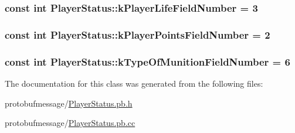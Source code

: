 \hypertarget{class_player_status_a335a1328cd6c4be06ecb9c13e6ea9abf}{
\subsubsection[{k\-Player\-Life\-Field\-Number}]{\setlength{\rightskip}{0pt plus 5cm}const int Player\-Status\-::k\-Player\-Life\-Field\-Number = 3\hspace{0.3cm}{\ttfamily [static]}}}\label{class_player_status_a335a1328cd6c4be06ecb9c13e6ea9abf}
\hypertarget{class_player_status_acf4acbabe53753e3554a06ef928683a0}{
\subsubsection[{k\-Player\-Points\-Field\-Number}]{\setlength{\rightskip}{0pt plus 5cm}const int Player\-Status\-::k\-Player\-Points\-Field\-Number = 2\hspace{0.3cm}{\ttfamily [static]}}}\label{class_player_status_acf4acbabe53753e3554a06ef928683a0}
\hypertarget{class_player_status_a5afa1140c6bf97e7a35b8c15a529022e}{
\subsubsection[{k\-Type\-Of\-Munition\-Field\-Number}]{\setlength{\rightskip}{0pt plus 5cm}const int Player\-Status\-::k\-Type\-Of\-Munition\-Field\-Number = 6\hspace{0.3cm}{\ttfamily [static]}}}\label{class_player_status_a5afa1140c6bf97e7a35b8c15a529022e}


The documentation for this class was generated from the following files\-:\begin{DoxyCompactItemize}
\item 
protobufmessage/\hyperlink{_player_status_8pb_8h}{Player\-Status.\-pb.\-h}\item 
protobufmessage/\hyperlink{_player_status_8pb_8cc}{Player\-Status.\-pb.\-cc}\end{DoxyCompactItemize}

